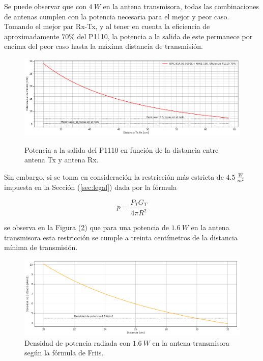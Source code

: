 Se puede observar que con $4 \ W$ en la antena transmisora, todas las combinaciones de antenas cumplen con la potencia necesaria para el mejor y peor caso. Tomando el mejor par Rx-Tx, y al tener en cuenta la eficiencia de aproximadamente $70\%$ del P1110, la potencia a la salida de este permanece por encima del peor caso hasta la máxima distancia de transmisión.

\begin{figure}[H]
	\centering
	\includegraphics[width=\linewidth]{ImagenesFactibilidad/pot_baterias_teorica}
	\label{fig:pot_baterias_teorica}
	\caption{Potencia a la salida del P1110 en función de la distancia entre antena Tx y antena Rx.}
\end{figure}

Sin embargo, si se toma en consideración la restricción más estricta de $4.5 \  \frac{W}{m^2}$ impuesta en la Sección (\ref{sec:legal}) dada por la fórmula

\begin{equation}
	p = \frac{P_TG_T}{4\pi R^2}
\end{equation}

se observa en la Figura (\ref{fig:densidadradiada}) que para una potencia de $1.6 \ W$ en la antena transmisora esta restricción se cumple a treinta centímetros de la distancia mínima de transmisión.

\begin{figure}[H]
	\centering
	\includegraphics[width=\linewidth]{ImagenesFactibilidad/densidadradiada}
	\caption{Densidad de potencia radiada con $1.6 \ W$ en la antena transmisora según la fórmula de Friis.}
	\label{fig:densidadradiada}
\end{figure}


